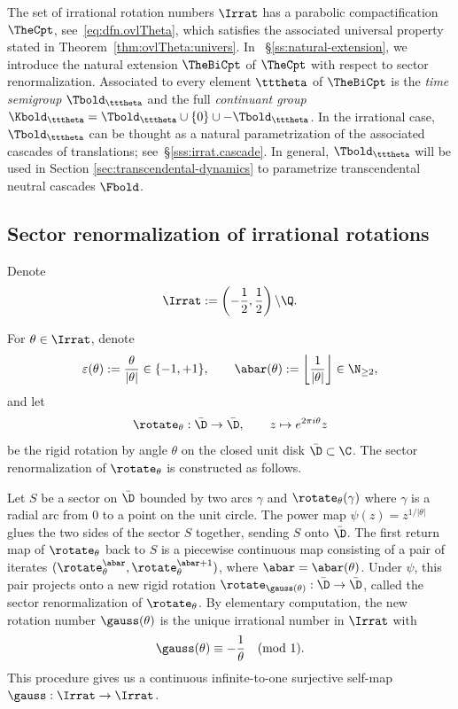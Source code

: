 \documentclass{amsart}
\begin{document}
The set of irrational rotation numbers $\Irrat$ has a parabolic compactification $\TheCpt$, see~\eqref{eq:dfn.ovlTheta}, which satisfies the associated universal property stated in Theorem~\ref{thm:ovlTheta:univers}. In ~\S\ref{ss:natural-extension}, we introduce the natural extension $\TheBiCpt$ of $\TheCpt$ with respect to sector renormalization. Associated to every element $\tttheta$ of $\TheBiCpt$ is the \emph{time semigroup} $\Tbold_{\tttheta}$ and the full \emph{continuant group} $\Kbold_{\tttheta} = \Tbold_{\tttheta} \cup \{0\} \cup -\Tbold_{\tttheta}$. In the irrational case, $\Tbold_{\tttheta}$ can be thought as a natural parametrization of the associated cascades of translations; see~\S\ref{sss:irrat.cascade}. In general, $\Tbold_{\tttheta}$ will be used in Section \ref{sec:transcendental-dynamics} to parametrize transcendental neutral cascades $\Fbold$.



\subsection{Sector renormalization of irrational rotations}
\label{ss:sect.renorm}

Denote
\begin{equation}
\label{eq:irrat.dfn}
    \Irrat := \left( -\frac{1}{2},\frac{1}{2} \right) \backslash \Q.
\end{equation}

For $\theta \in \Irrat$, denote
\[
    \varepsilon(\theta) := \frac{\theta}{|\theta|} \in \{-1,+1\}, \quad \quad 
    \abar(\theta) := \left\lfloor \frac{1}{|\theta|} \right\rfloor \in \N_{\geq 2},
\]
and let
\[
    \rotate_\theta : \bar{\D} \to \bar{\D}, \qquad z \mapsto e^{2\pi i \theta} z
\]
be the rigid rotation by angle $\theta$ on the closed unit disk $\bar{\D} \subset \C$.
The sector renormalization of $\rotate_\theta$ is constructed as follows.

Let $S$ be a sector on $\bar{\D}$ bounded by two arcs $\gamma$ and $\rotate_\theta(\gamma)$ where $\gamma$ is a radial arc from $0$ to a point on the unit circle.
The power map $\psi(z) = z^{1/|\theta|}$ glues the two sides of the sector $S$ together, sending $S$ onto $\bar{\D}$.
The first return map of $\rotate_\theta$ back to $S$ is a piecewise continuous map consisting of a pair of iterates $(\rotate_\theta^{\abar}, \rotate_\theta^{\abar+1})$, where $\abar = \abar(\theta)$.
Under $\psi$, this pair projects onto a new rigid rotation $\rotate_{\gauss(\theta)}: \bar{\D} \to \bar{\D}$, called the sector renormalization of $\rotate_{\theta}$.
By elementary computation, the new rotation number $\gauss(\theta)$ is the unique irrational number in $\Irrat$ with
\[
    \gauss(\theta) \equiv -\frac{1}{\theta} \quad (\textnormal{mod }1).
\]
This procedure gives us a continuous infinite-to-one surjective self-map $\gauss: \Irrat \to \Irrat$.
\end{document}
